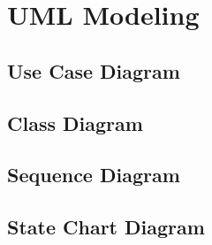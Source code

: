 \chapter{UML Modeling} \label{cap:cap4}
\section{Use Case Diagram}
\section{Class Diagram}
\section{Sequence Diagram}
\section{State Chart Diagram}


 